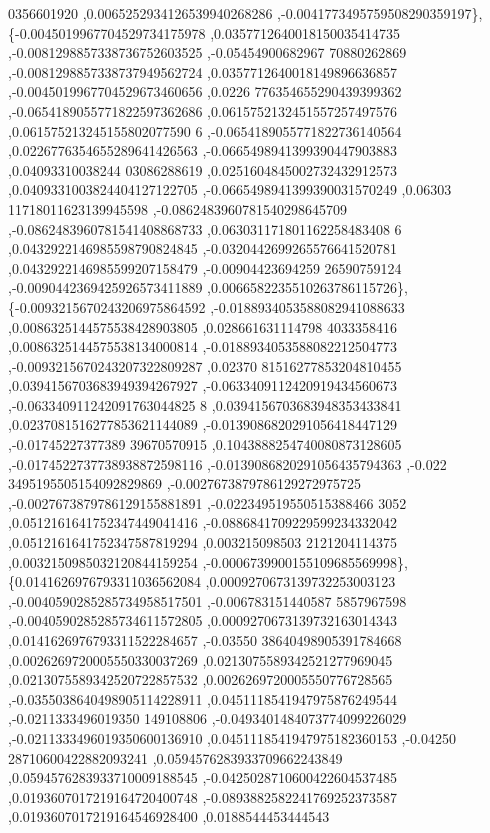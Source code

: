 \begin{DoxyCode}
      0356601920 ,0.0065252934126539940268286 ,-0.0041773495759508290359197\},
\{-0.0045019967704529734175978 ,0.0357712640018150035414735 ,-0.0081298857338736752603525 ,-0.05454900682967
      70880262869 ,-0.0081298857338737949562724 ,0.0357712640018149896636857 ,-0.0045019967704529673460656 ,0.0226
      776354655290439399362 ,-0.0654189055771822597362686 ,0.0615752132451557257497576 ,0.061575213245155802077590
      6 ,-0.0654189055771822736140564 ,0.0226776354655289641426563 ,-0.0665498941399390447903883 ,0.04093310038244
      03086288619 ,0.0251604845002732432912573 ,0.0409331003824404127122705 ,-0.0665498941399390031570249 ,0.06303
      11718011623139945598 ,-0.0862483960781540298645709 ,-0.0862483960781541408868733 ,0.063031171801162258483408
      6 ,0.0432922146985598790824845 ,-0.0320442699265576641520781 ,0.0432922146985599207158479 ,-0.00904423694259
      26590759124 ,-0.0090442369425926573411889 ,0.0066582235510263786115726\},
\{-0.0093215670243206975864592 ,-0.0188934053588082941088633 ,0.0086325144575538428903805 ,0.028661631114798
      4033358416 ,0.0086325144575538134000814 ,-0.0188934053588082212504773 ,-0.0093215670243207322809287 ,0.02370
      81516277853204810455 ,0.0394156703683949394267927 ,-0.0633409112420919434560673 ,-0.063340911242091763044825
      8 ,0.0394156703683948353433841 ,0.0237081516277853621144089 ,-0.0139086820291056418447129 ,-0.01745227377389
      39670570915 ,0.1043888254740080873128605 ,-0.0174522737738938872598116 ,-0.0139086820291056435794363 ,-0.022
      3495195505154092829869 ,-0.0027673879786129272975725 ,-0.0027673879786129155881891 ,-0.022349519550515388466
      3052 ,0.0512161641752347449041416 ,-0.0886841709229599234332042 ,0.0512161641752347587819294 ,0.003215098503
      2121204114375 ,0.0032150985032120844159254 ,-0.0006739900155109685569998\},
\{0.0141626976793311036562084 ,0.0009270673139732253003123 ,-0.0040590285285734958517501 ,-0.006783151440587
      5857967598 ,-0.0040590285285734611572805 ,0.0009270673139732163014343 ,0.0141626976793311522284657 ,-0.03550
      38640498905391784668 ,0.0026269720005550330037269 ,0.0213075589342521277969045 ,0.0213075589342520722857532 
      ,0.0026269720005550776728565 ,-0.0355038640498905114228911 ,0.0451118541947975876249544 ,-0.0211333496019350
      149108806 ,-0.0493401484073774099226029 ,-0.0211333496019350600136910 ,0.0451118541947975182360153 ,-0.04250
      28710600422882093241 ,0.0594576283933709662243849 ,0.0594576283933710009188545 ,-0.0425028710600422604537485
       ,0.0193607017219164720400748 ,-0.0893882582241769252373587 ,0.0193607017219164546928400 ,0.0188544453444543

\end{DoxyCode}
